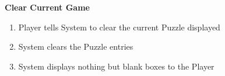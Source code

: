 \documentclass[letterpaper]{article}
\begin{document}
\noindent
\textbf{Clear Current Game}
\begin{enumerate}
\item Player tells System to clear the current Puzzle displayed
\item System clears the Puzzle entries
\item System displays nothing but blank boxes to the Player
\end{enumerate}
\end{document}
